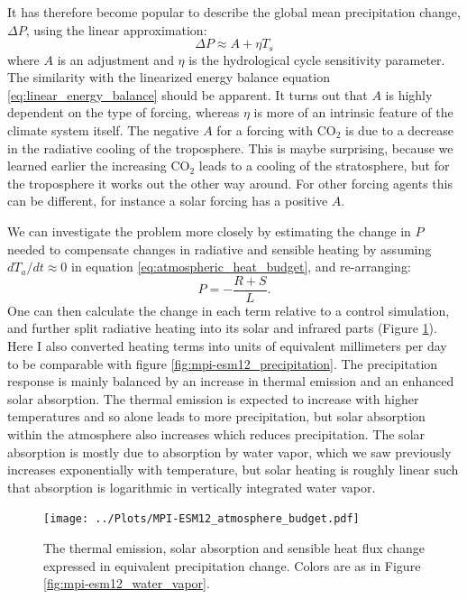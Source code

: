 \documentclass[12pt]{book}
\begin{document}
It has therefore become popular to describe the global mean precipitation change, $\Delta P$, using the linear approximation:
$$\Delta P \approx A +\eta T_s$$
where $A$ is an adjustment and $\eta$ is the hydrological cycle sensitivity parameter. The similarity with the linearized energy balance equation \ref{eq:linear_energy_balance} should be apparent. It turns out that $A$ is highly dependent on the type of forcing, whereas $\eta$ is more of an intrinsic feature of the climate system itself. The negative $A$ for a forcing with CO$_2$ is due to a decrease in the radiative cooling of the troposphere. This is maybe surprising, because we learned earlier the increasing CO$_2$ leads to a cooling of the stratosphere, but for the troposphere it works out the other way around. For other forcing agents this can be different, for instance a solar forcing has a positive $A$.

We can investigate the problem more closely by estimating the change in $P$ needed to compensate changes in radiative and sensible heating by assuming $dT_a/dt \approx 0$ in equation \ref{eq:atmospheric_heat_budget}, and re-arranging:
$$ P = -\frac{R + S}{L}. $$
One can then calculate the change in each term relative to a control simulation, and further split radiative heating into its solar and infrared parts (Figure \ref{fig:mpi-esm12_atmosphere_budget}). Here I also converted heating terms into units of equivalent millimeters per day to be comparable with figure \ref{fig:mpi-esm12_precipitation}. 
The precipitation response is mainly balanced by an increase in thermal emission and an enhanced solar absorption. The thermal emission is expected to increase with higher temperatures and so alone leads to more precipitation, but solar absorption within the atmosphere also increases which reduces precipitation. The solar absorption is mostly due to absorption by water vapor, which we saw previously increases exponentially with temperature, but solar heating is roughly linear such that absorption is logarithmic in vertically integrated water vapor. 

\begin{figure}
\begin{center}
\texttt{[image: ../Plots/MPI-ESM12\_atmosphere\_budget.pdf]}
\end{center}
\caption{ The thermal emission, solar absorption and sensible heat flux change expressed in equivalent precipitation change. Colors are as in Figure \ref{fig:mpi-esm12_water_vapor}. } 
\label{fig:mpi-esm12_atmosphere_budget}
\end{figure}
\end{document}
